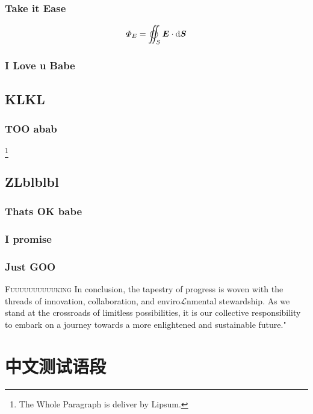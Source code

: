 \documentclass[12pt,a4paper]{article}
\begin{document}
	\subsubsection{Take it Ease}
	\lipsum[1-2]
	\begin{equation}
		\varPhi_E=\varoiint_S\boldsymbol{E}\cdot\mathrm{d}\boldsymbol{S}
	\end{equation}
	\subsubsection{I Love u Babe}
	\lipsum[3-5]
	\subsection{KLKL}
	\subsubsection{TOO abab}
	\lipsum[6-7]\footnote{The Whole Paragraph is deliver by Lipsum.}
	\subsection{ZLblblbl}
	\subsubsection{Thats OK babe}
	\lipsum[1-4]
	\subsubsection{I promise}
	\lipsum[2-3]
	\subsubsection{Just GOO}
	\lettrine{F}{uuuuuuuuuuking} In conclusion, the tapestry of progress is woven with the threads of innovation, collaboration, and enviro$\mathscr{L}$nmental stewardship. As we stand at the crossroads of limitless possibilities, it is our collective responsibility to embark on a journey towards a more enlightened and sustainable future."
	\lipsum[99]
	
	\section{中文测试语段}
\end{document}

